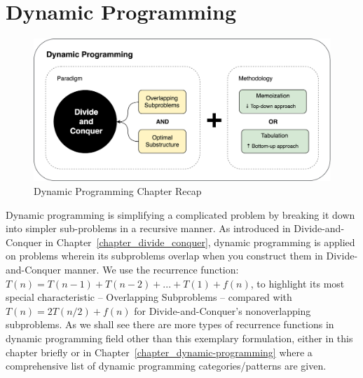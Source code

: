 \documentclass[../main.tex]{subfiles}
\begin{document}
\chapter{Dynamic Programming}
\begin{figure}[h]
    \centering
    \includegraphics[width=0.95\columnwidth]{fig/dynamic_programming_chapter.png}
    \caption{Dynamic Programming Chapter Recap}
    \label{fig:dynamic_prorgramming_divide_conquer}
\end{figure}


Dynamic programming is simplifying a complicated problem by breaking it down into simpler sub-problems in a recursive manner. As introduced in Divide-and-Conquer in Chapter~\ref{chapter_divide_conquer}, dynamic programming is applied on problems wherein its subproblems overlap when you construct them in Divide-and-Conquer manner.  We use the recurrence function: $T(n) = T(n-1) + T(n-2) +...+T(1) + f(n)$, to highlight its most special characteristic -- Overlapping Subproblems -- compared with $T(n)=2T(n/2)+f(n)$ for Divide-and-Conquer's nonoverlapping subproblems.  As we shall see there are more types of recurrence functions in dynamic programming field other than this exemplary formulation, either in this chapter briefly or in Chapter~\ref{chapter_dynamic-programming} where a comprehensive list of dynamic programming categories/patterns are given.
\end{document}
